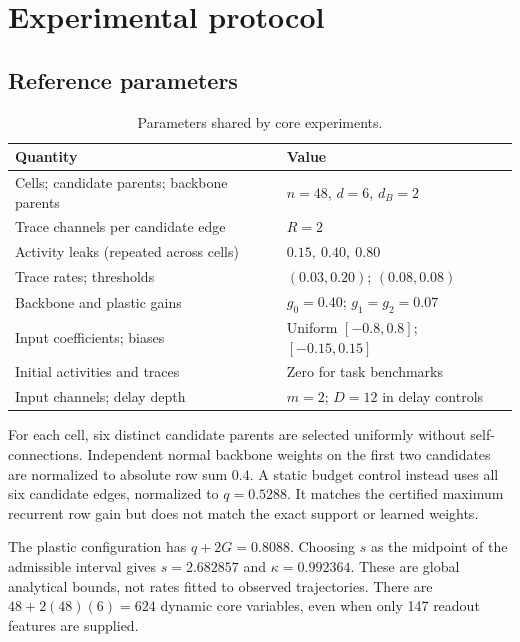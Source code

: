 \documentclass[11pt,a4paper]{article}
\theoremstyle{definition}\newtheorem{definition}[theorem]{Definition}
\begin{document}
\section{Experimental protocol}
\subsection{Reference parameters}
\begin{table}[H]\centering
\caption{Parameters shared by core experiments.}
\begin{tabular}{ll}\toprule
Quantity & Value \\\midrule
Cells; candidate parents; backbone parents & $n=48$, $d=6$, $d_B=2$ \\
Trace channels per candidate edge & $R=2$ \\
Activity leaks (repeated across cells) & $0.15,\ 0.40,\ 0.80$ \\
Trace rates; thresholds & $(0.03,0.20)$; $(0.08,0.08)$ \\
Backbone and plastic gains & $g_0=0.40$; $g_1=g_2=0.07$ \\
Input coefficients; biases & Uniform $[-0.8,0.8]$; $[-0.15,0.15]$ \\
Initial activities and traces & Zero for task benchmarks \\
Input channels; delay depth & $m=2$; $D=12$ in delay controls \\\bottomrule
\end{tabular}\label{tab:params}
\end{table}
For each cell, six distinct candidate parents are selected uniformly without self-connections. Independent normal backbone weights on the first two candidates are normalized to absolute row sum $0.4$. A static budget control instead uses all six candidate edges, normalized to $q=0.5288$. It matches the certified maximum recurrent row gain but does not match the exact support or learned weights.

The plastic configuration has $q+2G=0.8088$. Choosing $s$ as the midpoint of the admissible interval gives $s=2.682857$ and $\kappa=0.992364$. These are global analytical bounds, not rates fitted to observed trajectories. There are $48+2(48)(6)=624$ dynamic core variables, even when only 147 readout features are supplied.
\end{document}
